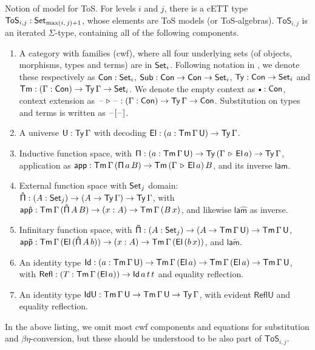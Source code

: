 \documentclass{llncs}
\newcommand{\ToS}{\mathsf{ToS}}
\newcommand{\ext}{\triangleright}
\newcommand{\emptycon}{\scaleobj{.75}\bullet}
\newcommand{\Pii}{\mathsf{\Pi}}
\newcommand{\appi}{\mathsf{app}}
\newcommand{\lami}{\mathsf{lam}}
\newcommand{\Pie}{\mathsf{\hat{\Pi}}}
\newcommand{\appe}{\mathsf{ap\hat{p}}}
\newcommand{\lame}{\mathsf{la\hat{m}}}
\newcommand{\Piinf}{\mathsf{\tilde{\Pi}}}
\newcommand{\appinf}{\mathsf{ap\tilde{p}}}
\newcommand{\laminf}{\mathsf{la\tilde{m}}}
\newcommand{\Refl}{\mathsf{Refl}}
\newcommand{\IdU}{\mathsf{IdU}}
\newcommand{\ReflU}{\mathsf{ReflU}}
\begin{document}
\begin{nidefinition}{Notion of model for ToS.}\label{def:tos}
For levels $i$ and $j$, there is a cETT type $\ToS_{i,j} : \Set_{\max(i,\,j)+1}$, whose elements are
ToS models (or ToS-algebras). $\ToS_{i,j}$ is an iterated $\Sigma$-type, containing
all of the following components.
\begin{enumerate}
\item
  A category with families (cwf), where all four underlying sets (of
  objects, morphisms, types and terms) are in $\mathsf{Set}_i$. Following notation in
  \cite{TODO}, we denote these respectively as $\mathsf{Con} : \mathsf{Set}_i$, $\mathsf{Sub} : \mathsf{Con} \rightarrow
  \mathsf{Con} \rightarrow \mathsf{Set}_i$, $\mathsf{Ty} : \mathsf{Con} \rightarrow \mathsf{Set}_i$ and $\mathsf{Tm} : (\Gamma : \mathsf{Con}) \rightarrow
  \mathsf{Ty}\,\Gamma \rightarrow \mathsf{Set}_i$. We denote the empty context as $\emptycon : \Con$,
  context extension as $\blank\ext\blank : (\Gamma : \Con)\ra \Ty\,\Gamma \ra \Con$.
  Substitution on types and terms is written as $\mathord{\hspace{1pt}\text{--}\hspace{1pt}}[\mathord{\hspace{1pt}\text{--}\hspace{1pt}}]$.
\item
  A universe $\mathsf{U} : \mathsf{Ty}\,\Gamma$ with decoding $\mathsf{El} : (a : \mathsf{Tm}\,\Gamma\,\mathsf{U}) \rightarrow
  \mathsf{Ty}\,\Gamma$.
\item
  Inductive function space, with $\Pii : (a : \Tm\,\Gamma\,\U) \ra
  \Ty\,(\Gamma\,\ext\,\El\,a) \ra \Ty\,\Gamma$, application as $\appi :
  \Tm\,\Gamma\,(\Pii\,a\,B)\ra \Tm\,(\Gamma\,\ext\,\El\,a)\,B$, and its inverse
  $\lami$.
\item
  External function space with $\mathsf{Set}_j$ domain: $\Pie : (A : \Set_j)\ra(A \ra
  \Ty\,\Gamma)\ra \Ty\,\Gamma$, with $\appe : \Tm\,\Gamma\,(\Pie\,A\,B)\ra(x :
  A)\ra \Tm\,\Gamma\,(B\,x)$, and likewise $\lame$ as inverse.
\item
  Infinitary function space, with $\Piinf : (A : \Set_j)\ra(A \ra
  \Tm\,\Gamma\,\U)\ra \Tm\,\Gamma\,\U$, $\appinf :
  \Tm\,\Gamma\,(\El\,(\Pie\,A\,b))\ra(x : A)\ra \Tm\,\Gamma\,(\El\,(b\,x))$, and
  $\laminf$.
\item
  An identity type $\mathsf{Id} : (a : \mathsf{Tm}\,\Gamma\,\mathsf{U})\rightarrow
  \mathsf{Tm}\,\Gamma\,(\mathsf{El}\,a)\rightarrow\mathsf{Tm}\,\Gamma\,(\mathsf{El}\,a)\rightarrow \mathsf{Tm}\,\Gamma\,\mathsf{U}$, with
  $\Refl : (T : \Tm\,\Gamma\,(\El\,a))\ra \Id\,a\,t\,t$ and equality reflection.
\item
  An identity type $\IdU : \Tm\,\Gamma\,\U \ra \Tm\,\Gamma\,\U \ra \Ty\,\Gamma$, with
  evident $\ReflU$ and equality reflection.
\end{enumerate}
\end{nidefinition}
In the above listing, we omit most cwf components and equations for substitution and
$\beta\eta$-conversion, but these should be understood to be also part of $\ToS_{i,j}$.
\end{document}

